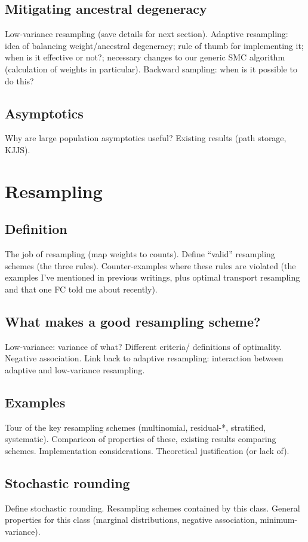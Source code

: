 \subsection{Mitigating ancestral degeneracy}
Low-variance resampling (save details for next section). Adaptive resampling: idea of balancing weight/ancestral degeneracy; rule of thumb for implementing it; when is it effective or not?; necessary changes to our generic SMC algorithm (calculation of weights in particular). Backward sampling: when is it possible to do this?

\subsection{Asymptotics}
Why are large population asymptotics useful? Existing results (path storage, KJJS).


\section{Resampling}

\subsection{Definition}
The job of resampling (map weights to counts). Define ``valid'' resampling schemes (the three rules). Counter-examples where these rules are violated (the examples I've mentioned in previous writings, plus optimal transport resampling and that one FC told me about recently).

\subsection{What makes a good resampling scheme?}
Low-variance: variance of what? Different criteria/ definitions of optimality. Negative association. Link back to adaptive resampling: interaction between adaptive and low-variance resampling.

\subsection{Examples}
Tour of the key resampling schemes (multinomial, residual-*, stratified, systematic). Comparicon of properties of these, existing results comparing schemes. Implementation considerations. Theoretical justification (or lack of).

\subsection{Stochastic rounding}
Define stochastic rounding. Resampling schemes contained by this class. General properties for this class (marginal distributions, negative association, minimum-variance).


